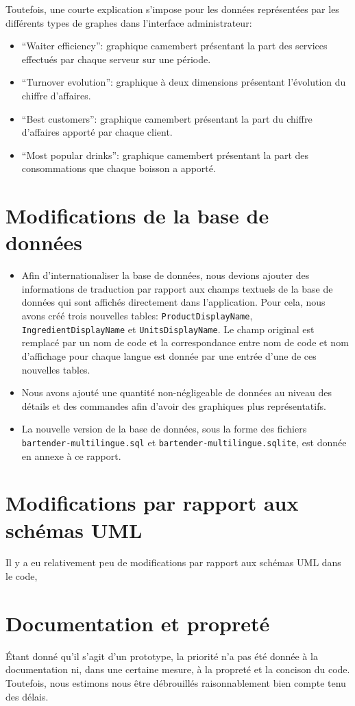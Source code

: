 \documentclass[a4paper,10pt]{article}
\begin{document}
Toutefois, une courte explication s'impose pour les données représentées par les différents types de graphes dans l'interface administrateur:
\begin{itemize}
    \item ``Waiter efficiency'': graphique camembert présentant la part des services effectués par chaque serveur sur une période.
    \item ``Turnover evolution'': graphique à deux dimensions présentant l'évolution du chiffre d'affaires.
    \item ``Best customers'': graphique camembert présentant la part du chiffre d'affaires apporté par chaque client.
    \item ``Most popular drinks'': graphique camembert présentant la part des consommations que chaque boisson a apporté.
\end{itemize}

\section{Modifications de la base de données}

\begin{itemize}
    \item Afin d'internationaliser la base de données, nous devions ajouter des informations de traduction par rapport aux champs textuels de la base de données qui sont affichés directement dans l'application. Pour cela, nous avons créé trois nouvelles tables: \texttt{ProductDisplayName}, \texttt{IngredientDisplayName} et \texttt{UnitsDisplayName}. Le champ original est remplacé par un nom de code et la correspondance entre nom de code et nom d'affichage pour chaque langue est donnée par une entrée d'une de ces nouvelles tables.
    \item Nous avons ajouté une quantité non-négligeable de données au niveau des détails et des commandes afin d'avoir des graphiques plus représentatifs.
    \item La nouvelle version de la base de données, sous la forme des fichiers \texttt{bartender-multilingue.sql} et \texttt{bartender-multilingue.sqlite}, est donnée en annexe à ce rapport.
\end{itemize}

\section{Modifications par rapport aux schémas UML}

Il y a eu relativement peu de modifications par rapport aux schémas UML dans le code, 

\section{Documentation et propreté}

Étant donné qu'il s'agit d'un prototype, la priorité n'a pas été donnée à la documentation ni, dans une certaine mesure, à la propreté et la concison du code. Toutefois, nous estimons nous être débrouillés raisonnablement bien compte tenu des délais.
\end{document}
